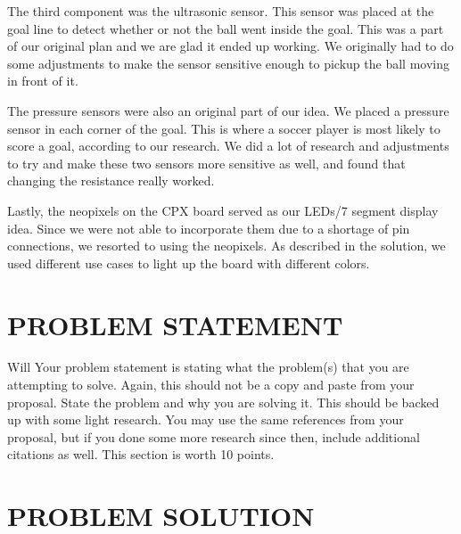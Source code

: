 \documentclass[12pt]{article}
\begin{document}
The third component was the ultrasonic sensor. This sensor was placed at the goal line to detect whether or not the ball went inside the goal. This was a part of our original plan and we are glad it ended up working. We originally had to do some adjustments to make the sensor sensitive enough to pickup the ball moving in front of it. 

The pressure sensors were also an original part of our idea. We placed a pressure sensor in each corner of the goal. This is where a soccer player is most likely to score a goal, according to our research. We did a lot of research and adjustments to try and make these two sensors more sensitive as well, and found that changing the resistance really worked. 

Lastly, the neopixels on the CPX board served as our LEDs/7 segment display idea. Since we were not able to incorporate them due to a shortage of pin connections, we resorted to using the neopixels. As described in the solution, we used different use cases to light up the board with different colors. 


\section{PROBLEM STATEMENT}
Will
Your problem statement is stating what the problem(s) that you are attempting to solve. Again, this should not be a copy and paste from your proposal. State the problem and why you are solving it. This should be backed up with some light research. You may use the same references from your proposal, but if you done some more research since then, include additional citations as well. This section is worth 10 points.


\section{PROBLEM SOLUTION}%

\end{document}
